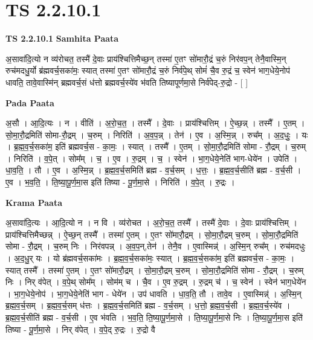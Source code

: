\documentclass[17pt]{extarticle}
\begin{document}
\section{ TS 2.2.10.1 }

\textbf{TS 2.2.10.1 } \newline
\textbf{Samhita Paata} \newline

अ॒सावा॑दि॒त्यो न व्य॑रोचत॒ तस्मै॑ दे॒वाः प्राय॑श्चित्तिमैच्छ॒न् तस्मा॑ ए॒तꣳ सो॑मारौ॒द्रं च॒रुं निर॑वप॒न् तेनै॒वास्मि॒न् रुच॑मदधु॒र्यो ब्र॑ह्मवर्च॒सका॑मः॒ स्यात् तस्मा॑ ए॒तꣳ सो॑मारौ॒द्रं च॒रुं निर्व॑पे॒थ् सोमं॑ चै॒व रु॒द्रं च॒ स्वेन॑ भाग॒धेये॒नोप॑ धावति॒ तावे॒वास्मि॑न् ब्रह्मवर्च॒सं ध॑त्तो ब्रह्मवर्च॒स्ये॑व भ॑वति तिष्यापूर्णमा॒से निर्व॑पेद्-रु॒द्रो - [  ] \newline

\textbf{Pada Paata} \newline

अ॒सौ । आ॒दि॒त्यः । न । वीति॑ । अ॒रो॒च॒त॒ । तस्मै᳚ । दे॒वाः । प्राय॑श्चित्तिम् । ऐ॒च्छ॒न्न् । तस्मै᳚ । ए॒तम् । सो॒मा॒रौ॒द्रमिति॑ सोमा-रौ॒द्रम् । च॒रुम् । निरिति॑ । अ॒व॒प॒न्न् । तेन॑ । ए॒व । अ॒स्मि॒न्न् । रुच᳚म् । अ॒द॒धुः॒ । यः । ब्र॒ह्म॒व॒र्च॒सका॑म॒ इति॑ ब्रह्मवर्च॒स - का॒मः॒ । स्यात् । तस्मै᳚ । ए॒तम् । सो॒मा॒रौ॒द्रमिति॑ सोमा - रौ॒द्रम् । च॒रुम् । निरिति॑ । व॒पे॒त् । सोम᳚म् । च॒ । ए॒व । रु॒द्रम् । च॒ । स्वेन॑ । भा॒ग॒धेये॒नेति॑ भाग-धेये॑न । उपेति॑ । धा॒व॒ति॒ । तौ । ए॒व । अ॒स्मि॒न्न् । ब्र॒ह्म॒व॒र्च॒समिति॑ ब्रह्म - व॒र्च॒सम् । ध॒त्तः॒ । ब्र॒ह्म॒व॒र्च॒सीति॑ ब्रह्म - व॒र्च॒सी । ए॒व । भ॒व॒ति॒ । ति॒ष्या॒पू॒र्ण॒मा॒स इति॑ तिष्या - पू॒र्ण॒मा॒से । निरिति॑ । व॒पे॒त् । रु॒द्रः ।  \newline


\textbf{Krama Paata} \newline

अ॒सावा॑दि॒त्यः । आ॒दि॒त्यो न । न वि । व्य॑रोचत । अ॒रो॒च॒त॒ तस्मै᳚ । तस्मै॑ दे॒वाः । दे॒वाः प्राय॑श्चित्तिम् । प्राय॑श्चित्तिमैच्छन्न् । ऐ॒च्छ॒न् तस्मै᳚ । तस्मा॑ ए॒तम् । ए॒तꣳ सो॑मारौ॒द्रम् । सो॒मा॒रौ॒द्रम् च॒रुम् । सो॒मा॒रौ॒द्रमिति॑ सोमा - रौ॒द्रम् । च॒रुम् निः । निर॑वपन्न् । अ॒व॒प॒न्,तेन॑ । तेनै॒व । ए॒वास्मिन्न्॑ । अ॒स्मि॒न् रुच᳚म् । रुच॑मदधुः । अ॒द॒धु॒र् यः । यो ब्र॑ह्मवर्च॒सका॑मः । ब्र॒ह्म॒व॒र्च॒सका॑मः॒ स्यात् । ब्र॒ह्म॒व॒र्च॒सका॑म॒ इति॑ ब्रह्मवर्च॒स - का॒मः॒ । स्यात् तस्मै᳚ । तस्मा॑ ए॒तम् । ए॒तꣳ सो॑मारौ॒द्रम् । सो॒मा॒रौ॒द्रम् च॒रुम् । सो॒मा॒रौ॒द्रमिति॑ सोमा - रौ॒द्रम् । च॒रुम् निः । निर् व॑पेत् । व॒पे॒थ् सोम᳚म् । सोम॑म् च । चै॒व । ए॒व रु॒द्रम् । रु॒द्रम् च॑ । च॒ स्वेन॑ । स्वेन॑ भाग॒धेये॑न । भा॒ग॒धेये॒नोप॑ । भा॒ग॒धेये॒नेति॑ भाग - धेये॑न । उप॑ धावति । धा॒व॒ति॒ तौ । तावे॒व । ए॒वास्मिन्न्॑ । अ॒स्मि॒न् ब्र॒ह्म॒व॒र्च॒सम् । ब्र॒ह्म॒व॒र्च॒सम् ध॑त्तः । ब्र॒ह्म॒व॒र्च॒समिति॑ ब्रह्म - व॒र्च॒सम् । ध॒त्तो॒ ब्र॒ह्म॒व॒र्च॒सी । ब्र॒ह्म॒व॒र्च॒स्ये॑व । ब्र॒ह्म॒व॒र्च॒सीति॑ ब्रह्म - व॒र्च॒सी । ए॒व भ॑वति । भ॒व॒ति॒ ति॒ष्या॒पू॒र्ण॒मा॒से । ति॒ष्या॒पू॒र्ण॒मा॒से निः । ति॒ष्या॒पू॒र्ण॒मा॒स इति॑ तिष्या - पू॒र्ण॒मा॒से । निर् व॑पेत् । व॒पे॒द् रु॒द्रः । रु॒द्रो वै \newline
\end{document}
